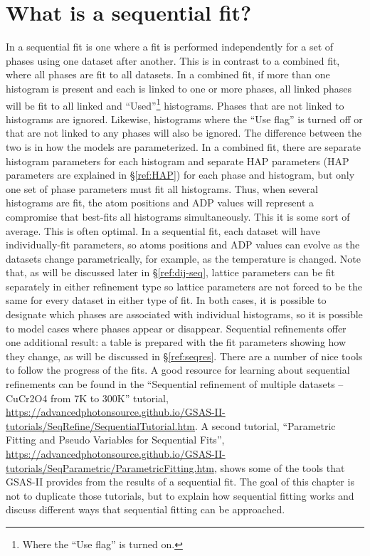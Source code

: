 \section{What is a sequential fit?}
In a sequential fit is one where a fit is performed independently for a set of phases using one dataset after another. This is in contrast to a combined fit, where all phases are fit to all datasets. In a combined fit, if more than one histogram is present and each is linked to one or more phases, all linked phases will be fit to all linked and ``Used''\footnote{Where the ``Use flag'' is turned on.} histograms.  Phases that are not linked to histograms are ignored. Likewise, histograms where the ``Use flag'' is turned off or that are not linked to any phases will also be ignored. 
The difference between the two is in how the models are parameterized. In a combined fit, there are separate histogram parameters for each histogram and separate HAP parameters (HAP parameters are  explained in \S\ref{ref:HAP}) for each phase and histogram, but only one set of phase parameters must fit all histograms. Thus, when several histograms are fit, 
the atom positions and ADP values will represent a compromise that best-fits all histograms simultaneously. This it is some sort of average. This is often optimal. In a sequential fit, each dataset will have individually-fit parameters, so atoms positions and ADP values can evolve as the datasets change parametrically, for example, as the temperature is changed. 
Note that, as will be discussed later in \S\ref{ref:dij-seq}, lattice parameters can be fit separately in either refinement type so lattice parameters are not forced to be the same for every dataset in either type of fit. 
In both cases, it is possible to designate which phases are associated with individual histograms, so it is possible to model cases where phases appear or disappear. 
Sequential refinements offer one additional result: a table is prepared with the fit parameters showing how they change, as will be discussed in \S\ref{ref:seqres}. There are  a number of nice tools to follow the progress of the fits. 
A good resource for learning about sequential refinements can be found in the ``Sequential refinement of multiple datasets – CuCr2O4 from 7K to 300K'' tutorial, 
\url{https://advancedphotonsource.github.io/GSAS-II-tutorials/SeqRefine/SequentialTutorial.htm}. A second tutorial, ``Parametric Fitting and Pseudo Variables for Sequential Fits'', 
\url{https://advancedphotonsource.github.io/GSAS-II-tutorials/SeqParametric/ParametricFitting.htm}, 
shows some of the tools that GSAS-II provides from the results of a sequential fit. 
The goal of this chapter is not to duplicate those tutorials, but to explain how sequential fitting works and discuss different ways that sequential fitting can be approached.

